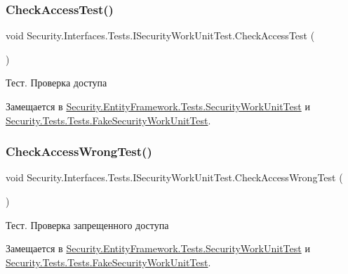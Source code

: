 \subsubsection{\texorpdfstring{Check\+Access\+Test()}{CheckAccessTest()}}
{\footnotesize\ttfamily void Security.\+Interfaces.\+Tests.\+I\+Security\+Work\+Unit\+Test.\+Check\+Access\+Test (\begin{DoxyParamCaption}{ }\end{DoxyParamCaption})}



Тест. Проверка доступа 



Замещается в \hyperlink{class_security_1_1_entity_framework_1_1_tests_1_1_security_work_unit_test_a54916ae7b83147cf599d5b41c477d0d1}{Security.\+Entity\+Framework.\+Tests.\+Security\+Work\+Unit\+Test} и \hyperlink{class_security_1_1_tests_1_1_tests_1_1_fake_security_work_unit_test_a2da79c29f4b39e85c7decdddb31035de}{Security.\+Tests.\+Tests.\+Fake\+Security\+Work\+Unit\+Test}.

\mbox{\label{interface_security_1_1_interfaces_1_1_tests_1_1_i_security_work_unit_test_a5dddedd2dd42cb99e6d0c47742996356}} 
\subsubsection{\texorpdfstring{Check\+Access\+Wrong\+Test()}{CheckAccessWrongTest()}}
{\footnotesize\ttfamily void Security.\+Interfaces.\+Tests.\+I\+Security\+Work\+Unit\+Test.\+Check\+Access\+Wrong\+Test (\begin{DoxyParamCaption}{ }\end{DoxyParamCaption})}



Тест. Проверка запрещенного доступа 



Замещается в \hyperlink{class_security_1_1_entity_framework_1_1_tests_1_1_security_work_unit_test_ab1ed6b439cdccc8b1f52fd1d6b4870fa}{Security.\+Entity\+Framework.\+Tests.\+Security\+Work\+Unit\+Test} и \hyperlink{class_security_1_1_tests_1_1_tests_1_1_fake_security_work_unit_test_a1a77f767a7129dd5fde97f393eeab1f3}{Security.\+Tests.\+Tests.\+Fake\+Security\+Work\+Unit\+Test}.

